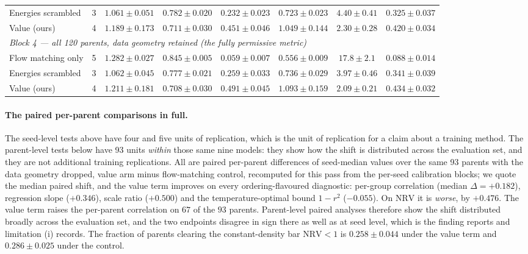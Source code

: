 \begin{table}[h]
\begin{center}
\begin{tabular}{lccccccc}
Energies scrambled  & 3 & $1.061 \pm 0.051$ & $0.782 \pm 0.020$ & $0.232 \pm 0.023$ & $0.723 \pm 0.023$ & $4.40 \pm 0.41$ & $0.325 \pm 0.037$ \\
Value (ours)        & 4 & $1.189 \pm 0.173$ & $0.711 \pm 0.030$ & $0.451 \pm 0.046$ & $1.049 \pm 0.144$ & $2.30 \pm 0.28$ & $0.420 \pm 0.034$ \\
\midrule
\multicolumn{8}{l}{\emph{Block 4 --- all 120 parents, data geometry retained (the fully permissive metric)}} \\
Flow matching only  & 5 & $1.282 \pm 0.027$ & $0.845 \pm 0.005$ & $0.059 \pm 0.007$ & $0.556 \pm 0.009$ & $17.8 \pm 2.1$ & $0.088 \pm 0.014$ \\
Energies scrambled  & 3 & $1.062 \pm 0.045$ & $0.777 \pm 0.021$ & $0.259 \pm 0.033$ & $0.736 \pm 0.029$ & $3.97 \pm 0.46$ & $0.341 \pm 0.039$ \\
Value (ours)        & 4 & $1.211 \pm 0.181$ & $0.708 \pm 0.030$ & $0.491 \pm 0.045$ & $1.093 \pm 0.159$ & $2.09 \pm 0.21$ & $0.434 \pm 0.032$ \\
\bottomrule
\end{tabular}
\end{center}
\end{table}

\paragraph{The paired per-parent comparisons in full.} The seed-level tests above
have four and five units of replication, which is the unit of replication for a claim
about a training method. The parent-level tests below have 93 units \emph{within} those
same nine models: they show how the shift is distributed across the evaluation set, and
they are not additional training replications. All are paired per-parent differences of
seed-median values over the same 93 parents with the data geometry dropped, value arm
minus flow-matching control, recomputed for this pass from the per-seed calibration
blocks; we quote the median paired shift, and the value term improves on every
ordering-flavoured diagnostic: per-group correlation (median $\Delta = +0.182$),
regression slope ($+0.346$), scale ratio ($+0.500$) and the temperature-optimal bound
$1-r^2$ ($-0.055$). On $\mathrm{NRV}$ it is \emph{worse}, by $+0.476$. The value term
raises the per-parent correlation on $67$ of the $93$ parents. Parent-level paired
analyses therefore show the shift distributed broadly across the
evaluation set, and the two endpoints disagree in sign there as well as at seed level, which is the finding  reports and limitation (i)
records. The fraction of parents clearing the constant-density bar $\mathrm{NRV} < 1$
is $0.258 \pm 0.044$ under the value term and $0.286 \pm 0.025$ under the control.

